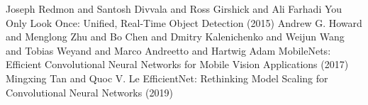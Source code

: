 \documentclass[10pt]{article}
\begin{document}
\begin{thebibliography}{9}
  Joseph Redmon and Santosh Divvala and Ross Girshick and Ali Farhadi
  You Only Look Once: Unified, Real-Time Object Detection (2015)
  Andrew G. Howard and Menglong Zhu and Bo Chen and Dmitry Kalenichenko and Weijun Wang and Tobias Weyand and Marco Andreetto and Hartwig Adam
  MobileNets: Efficient Convolutional Neural Networks for Mobile Vision Applications (2017) 
  Mingxing Tan and Quoc V. Le
  EfficientNet: Rethinking Model Scaling for Convolutional Neural Networks (2019)
\end{thebibliography}
\end{document}
